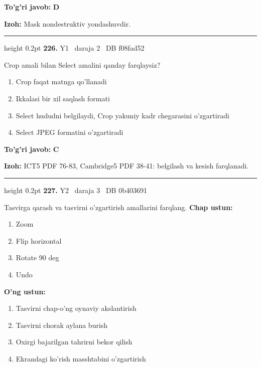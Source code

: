 \documentclass[10pt,a4paper,oneside]{article}
\begin{document}
\begin{tcolorbox}[enhanced,breakable,colback=teal!4,colframe=teal!45!black,boxrule=0.45pt,arc=1.2mm,left=2.8mm,right=2.8mm,top=2mm,bottom=2mm,before skip=2mm,after skip=2mm]
\textbf{\color{teal}To'g'ri javob:} \textbf{D}
\par\smallskip
\textbf{Izoh:} Mask nondestruktiv yondashuvdir.
\end{tcolorbox}
\vspace{2mm}\hrule height 0.2pt \vspace{4mm}
\hypertarget{q226}{\textbf{\color{ink}226.}}  {\color{muted}\scriptsize Y1 \textbullet\ daraja 2 \textbullet\ DB f08fad52}
\par
Crop amali bilan Select amalini qanday farqlaysiz?
\begin{enumerate}[label=\Alph*),leftmargin=9mm]
\item Crop faqat matnga qo'llanadi
\item Ikkalasi bir xil saqlash formati
\item Select hududni belgilaydi, Crop yakuniy kadr chegarasini o'zgartiradi
\item Select JPEG formatini o'zgartiradi
\end{enumerate}
\begin{tcolorbox}[enhanced,breakable,colback=teal!4,colframe=teal!45!black,boxrule=0.45pt,arc=1.2mm,left=2.8mm,right=2.8mm,top=2mm,bottom=2mm,before skip=2mm,after skip=2mm]
\textbf{\color{teal}To'g'ri javob:} \textbf{C}
\par\smallskip
\textbf{Izoh:} ICT5 PDF 76-83, Cambridge5 PDF 38-41: belgilash va kesish farqlanadi.
\end{tcolorbox}
\vspace{2mm}\hrule height 0.2pt \vspace{4mm}
\hypertarget{q227}{\textbf{\color{ink}227.}}  {\color{muted}\scriptsize Y2 \textbullet\ daraja 3 \textbullet\ DB 0b403691}
\par
Tasvirga qarash va tasvirni o'zgartirish amallarini farqlang.
\textbf{\footnotesize Chap ustun:}
\begin{enumerate}[label=\arabic*),leftmargin=9mm]
\item Zoom
\item Flip horizontal
\item Rotate 90 deg 
\item Undo
\end{enumerate}
\textbf{\footnotesize O'ng ustun:}
\begin{enumerate}[label=\Alph*),leftmargin=9mm]
\item Tasvirni chap-o'ng oynaviy akslantirish
\item Tasvirni chorak aylana burish
\item Oxirgi bajarilgan tahrirni bekor qilish
\item Ekrandagi ko'rish masshtabini o'zgartirish
\end{enumerate}
\end{document}
